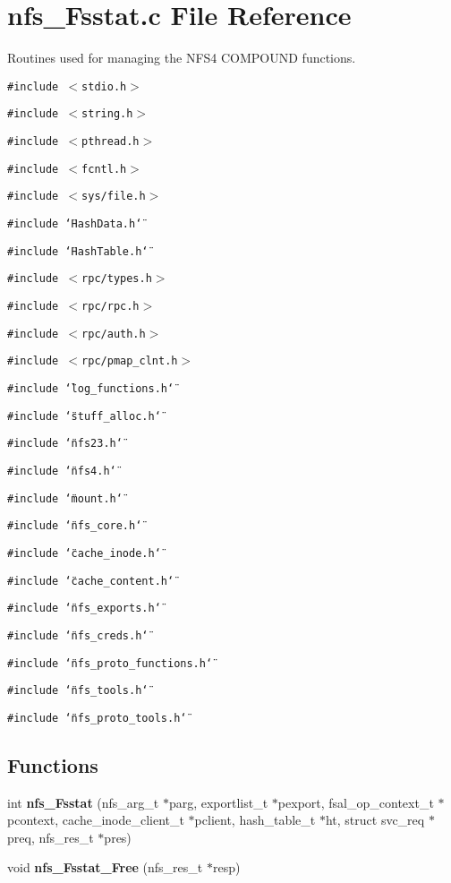 \section{nfs\_\-Fsstat.c File Reference}
\label{nfs__Fsstat_8c}
Routines used for managing the NFS4 COMPOUND functions. 

{\tt \#include $<$stdio.h$>$}\par
{\tt \#include $<$string.h$>$}\par
{\tt \#include $<$pthread.h$>$}\par
{\tt \#include $<$fcntl.h$>$}\par
{\tt \#include $<$sys/file.h$>$}\par
{\tt \#include \char`\"{}Hash\-Data.h\char`\"{}}\par
{\tt \#include \char`\"{}Hash\-Table.h\char`\"{}}\par
{\tt \#include $<$rpc/types.h$>$}\par
{\tt \#include $<$rpc/rpc.h$>$}\par
{\tt \#include $<$rpc/auth.h$>$}\par
{\tt \#include $<$rpc/pmap\_\-clnt.h$>$}\par
{\tt \#include \char`\"{}log\_\-functions.h\char`\"{}}\par
{\tt \#include \char`\"{}stuff\_\-alloc.h\char`\"{}}\par
{\tt \#include \char`\"{}nfs23.h\char`\"{}}\par
{\tt \#include \char`\"{}nfs4.h\char`\"{}}\par
{\tt \#include \char`\"{}mount.h\char`\"{}}\par
{\tt \#include \char`\"{}nfs\_\-core.h\char`\"{}}\par
{\tt \#include \char`\"{}cache\_\-inode.h\char`\"{}}\par
{\tt \#include \char`\"{}cache\_\-content.h\char`\"{}}\par
{\tt \#include \char`\"{}nfs\_\-exports.h\char`\"{}}\par
{\tt \#include \char`\"{}nfs\_\-creds.h\char`\"{}}\par
{\tt \#include \char`\"{}nfs\_\-proto\_\-functions.h\char`\"{}}\par
{\tt \#include \char`\"{}nfs\_\-tools.h\char`\"{}}\par
{\tt \#include \char`\"{}nfs\_\-proto\_\-tools.h\char`\"{}}\par
\subsection*{Functions}
\begin{CompactItemize}
\item 
int {\bf nfs\_\-Fsstat} (nfs\_\-arg\_\-t $\ast$parg, exportlist\_\-t $\ast$pexport, fsal\_\-op\_\-context\_\-t $\ast$pcontext, cache\_\-inode\_\-client\_\-t $\ast$pclient, hash\_\-table\_\-t $\ast$ht, struct svc\_\-req $\ast$preq, nfs\_\-res\_\-t $\ast$pres)
\item 
void {\bf nfs\_\-Fsstat\_\-Free} (nfs\_\-res\_\-t $\ast$resp)
\end{CompactItemize}


